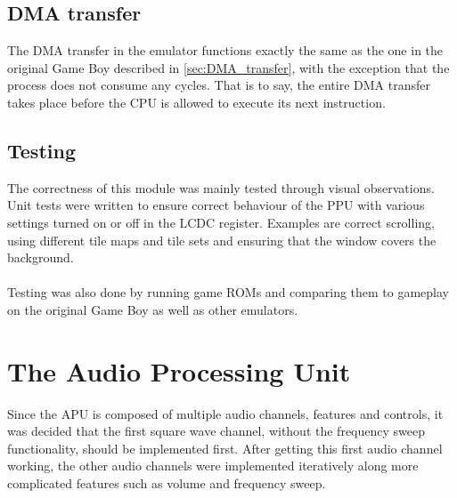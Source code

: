 \subsection{DMA transfer}
\label{sec:DMA_transfer_result}
The DMA transfer in the emulator functions exactly the same as the one in the original Game Boy described in \ref{sec:DMA_transfer}, with the exception that the process does not consume any cycles. That is to say, the entire DMA transfer takes place before the CPU is allowed to execute its next instruction.

\subsection{Testing}
The correctness of this module was mainly tested through visual observations. Unit tests were written to ensure correct behaviour of the PPU with various settings turned on or off in the LCDC register. Examples are correct scrolling, using different tile maps and tile sets and ensuring that the window covers the background.\\
\\
Testing was also done by running game ROMs and comparing them to gameplay on the original Game Boy as well as other emulators.

\section{The Audio Processing Unit}

Since the APU is composed of multiple audio channels, features and controls, it was decided that the first square wave channel, without the frequency sweep functionality, should be implemented first. After getting this first audio channel working, the other audio channels were implemented iteratively along more complicated features such as volume and frequency sweep.

